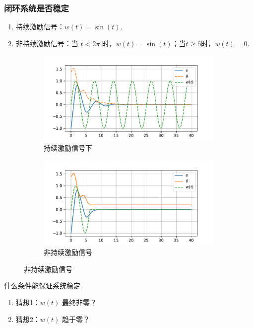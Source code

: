 \begin{frame}
    \frametitle{闭环系统是否稳定}

    \begin{enumerate}
        \item 持续激励信号：$w(t)=\sin(t)$.
        \item 非持续激励信号：当 $t< 2\pi$ 时，$w(t)=\sin(t)$；当$t\geq 5$时，$w(t)=0$.
    \end{enumerate}

    \begin{figure}
        \begin{subfigure}[b]{0.45\textwidth}
            \includegraphics[width=\linewidth]{figure/simple-pe.pdf}
            \caption{持续激励信号下}
        \end{subfigure}
        \begin{subfigure}[b]{0.45\textwidth}
            \includegraphics[width=\linewidth]{figure/simple-npe.pdf}
            \caption{非持续激励信号}
        \end{subfigure}
    \end{figure}

    \begin{block}{什么条件能保证系统稳定}
        \begin{enumerate}
            \item 猜想1：$w(t)$ 最终非零？
            \item 猜想2：$w(t)$ 趋于零？
        \end{enumerate}
    \end{block}
\end{frame}
